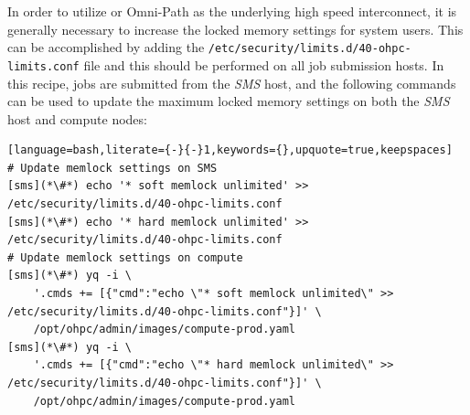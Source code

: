 In order to utilize \InfiniBand{} or Omni-Path as the underlying high speed
interconnect, it is generally necessary to increase the locked memory settings
for system users. This can be accomplished by adding the
\texttt{/etc/security/limits.d/40-ohpc-limits.conf} file and this should be
performed on all job submission hosts. In this recipe, jobs are submitted from
the {\em SMS} host, and the following commands can be used to update the
maximum locked memory settings on both the {\em SMS} host and compute nodes:

\begin{lstlisting}[language=bash,literate={-}{-}1,keywords={},upquote=true,keepspaces]
# Update memlock settings on SMS
[sms](*\#*) echo '* soft memlock unlimited' >> /etc/security/limits.d/40-ohpc-limits.conf
[sms](*\#*) echo '* hard memlock unlimited' >> /etc/security/limits.d/40-ohpc-limits.conf
# Update memlock settings on compute
[sms](*\#*) yq -i \
	'.cmds += [{"cmd":"echo \"* soft memlock unlimited\" >> /etc/security/limits.d/40-ohpc-limits.conf"}]' \
	/opt/ohpc/admin/images/compute-prod.yaml
[sms](*\#*) yq -i \
	'.cmds += [{"cmd":"echo \"* hard memlock unlimited\" >> /etc/security/limits.d/40-ohpc-limits.conf"}]' \
	/opt/ohpc/admin/images/compute-prod.yaml
\end{lstlisting}

